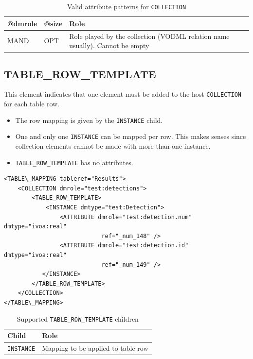 \documentclass[11pt,a4paper]{ivoa}
\begin{document}
\begin{table}[!t]
\small
\centering
\begin{tabulary}{\linewidth}{|L|L|J|}
    \hline 
        @dmrole   & 
        @size   &  
        Role\\
    \hline  \hline
       MAND & 
       OPT & 
       Role played by the collection (VODML relation name usually). Cannot be empty \\    
    \hline 
  \end{tabulary}
  \caption{Valid attribute patterns for  \texttt{COLLECTION}} 
  \label{tbl:coll-pattern}
 \end{table}

%
%

\subsection{TABLE\_ROW\_TEMPLATE}
This element indicates that one element must be added to the host \texttt{COLLECTION} for each table row.

\begin{itemize}
    \item The row mapping is given by the \texttt{INSTANCE} child.
    \item One and only one \texttt{INSTANCE} can be mapped per row. 
             This makes senses since collection elements cannot be made with more than one instance.
   \item \texttt{TABLE\_ROW\_TEMPLATE}  has no attributes.
\end{itemize}

\begin{lstlisting}[caption={TABLE\_ROW\_TEMPLATE examples},style=XML]
<TABLE\_MAPPING tableref="Results">
    <COLLECTION dmrole="test:detections">
        <TABLE_ROW_TEMPLATE>
            <INSTANCE dmtype="test:Detection">
                <ATTRIBUTE dmrole="test:detection.num" dmtype="ivoa:real"
                            ref="_num_148" />
                <ATTRIBUTE dmrole="test:detection.id" dmtype="ivoa:real"
                            ref="_num_149" />
           </INSTANCE>
        </TABLE_ROW_TEMPLATE>
    </COLLECTION>
</TABLE\_MAPPING>
\end{lstlisting}

\begin{table}[!h]
\small
\centering
\begin{tabulary}{\linewidth}{|L|J|}
       \hline  
          \textbf{Child} &  
          \textbf{Role}\\
       \hline  
          \texttt{INSTANCE}    & 
          Mapping to be applied to table row \\       
       \hline 
     \end{tabulary}
     \caption{Supported  \texttt{TABLE\_ROW\_TEMPLATE} children} 
     \label{trt:row-children}
\end{table}
\end{document}
